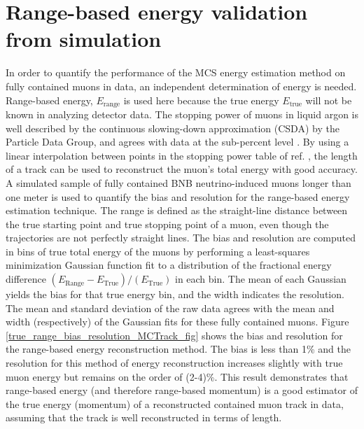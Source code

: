 \documentclass[a4paper,11pt]{article}
\begin{document}
\section{Range-based energy validation from simulation}\label{Range_Energy_Validation_section}
In order to quantify the performance of the MCS energy estimation method on fully contained muons in data, an independent determination of energy is needed. Range-based energy, $E_{\text{range}}$ is used here because the true energy $E_{\text{true}}$ will not be known in analyzing detector data. The stopping power of muons in liquid argon is well described by the continuous slowing-down approximation (CSDA) by the Particle Data Group, and agrees with data at the sub-percent level \cite{MIPenergysource,PDG_spline_table,NISTdata}. By using a linear interpolation between points in the stopping power table of ref. \cite{PDG_spline_table}, the length of a track can be used to reconstruct the muon's total energy with good accuracy. A simulated sample of fully contained BNB neutrino-induced muons longer than one meter is used to quantify the bias and resolution for the range-based energy estimation technique. The range is defined as the straight-line distance between the true starting point and true stopping point of a muon, even though the trajectories are not perfectly straight lines. The bias and resolution are computed in bins of true total energy of the muons by performing a least-squares minimization Gaussian function fit to a distribution of the fractional energy difference $(E_{\text{Range}}-E_{\text{True}})/(E_{\text{True}})$ in each bin. The mean of each Gaussian yields the bias for that true energy bin, and the width indicates the resolution. The mean and standard deviation of the raw data agrees with the mean and width (respectively) of the Gaussian fits for these fully contained muons. Figure \ref{true_range_bias_resolution_MCTrack_fig} shows the bias and resolution for the range-based energy reconstruction method. The bias is less than 1\% and the resolution for this method of energy reconstruction increases slightly with true muon energy but remains on the order of (2-4)\%. This result demonstrates that range-based energy (and therefore range-based momentum) is a good estimator of the true energy (momentum) of a reconstructed contained muon track in data, assuming that the track is well reconstructed in terms of length.
\end{document}
